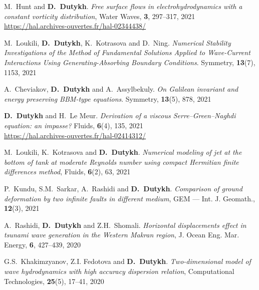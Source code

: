 \begin{etaremune}
  \item M.~Hunt and \textbf{D.~Dutykh}. \textit{Free surface flows in electrohydrodynamics with a constant vorticity distribution}, Water Waves, \textbf{3}, 297--317, 2021 \\ %
  \url{https://hal.archives-ouvertes.fr/hal-02344438/}
  
  \item M.~Loukili, \textbf{D.~Dutykh}, K.~Kotrasova and D.~Ning. \textit{Numerical Stability Investigations of the Method of Fundamental Solutions Applied to Wave-Current Interactions Using Generating-Absorbing Boundary Conditions}. Symmetry, \textbf{13}(7), 1153, 2021 %
  
  \item A.~Cheviakov, \textbf{D.~Dutykh} and A.~Assylbekuly. \textit{On Galilean invariant and energy preserving BBM-type equations}. Symmetry, \textbf{13}(5), 878, 2021 %
  
  \item \textbf{D.~Dutykh} and H.~Le Meur. \textit{Derivation of a viscous Serre--Green--Naghdi equation: an impasse?} Fluids, \textbf{6}(4), 135, 2021 \\ %
  \url{https://hal.archives-ouvertes.fr/hal-02414312/}
  
  \item M.~Loukili, K.~Kotrasova and \textbf{D.~Dutykh}. \textit{Numerical modeling of jet at the bottom of tank at moderate Reynolds number using compact Hermitian finite differences method}, Fluids, \textbf{6}(2), 63, 2021 %
  
  \item P.~Kundu, S.M.~Sarkar, A.~Rashidi and \textbf{D.~Dutykh}. \textit{Comparison of ground deformation by two infinite faults in different medium}, GEM --- Int. J. Geomath., \textbf{12}(3), 2021 %
  
  
  \item A.~Rashidi, \textbf{D.~Dutykh} and Z.H.~Shomali. \textit{Horizontal displacements effect in tsunami wave generation in the Western Makran region}, J. Ocean Eng. Mar. Energy, \textbf{6}, 427--439, 2020 %
  
  \item G.S.~Khakimzyanov, Z.I. Fedotova and \textbf{D.~Dutykh}. \textit{Two-dimensional model of wave hydrodynamics with high accuracy dispersion relation}, Computational Technologies, \textbf{25}(5), 17--41, 2020 %
  

\end{etaremune}
